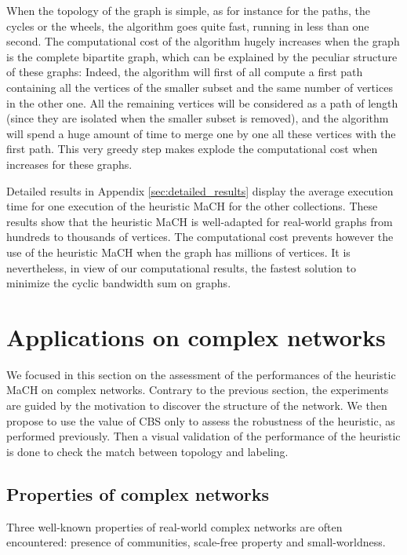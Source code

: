 \documentclass{scrartcl}
\theoremstyle{plain}
\newcommand{\algo}{MaCH}
\newcommand{\cbs}{CBS}
\begin{document}
When the topology of the graph is simple, as for instance for the paths, the 
cycles or the wheels, the algorithm goes quite fast, running in less than one 
second. The computational cost of the algorithm hugely increases when the graph 
is the complete bipartite graph, which can be explained by the peculiar 
structure of these graphs: Indeed, the algorithm will first of all compute a 
first path containing all the vertices of the smaller subset and the same number 
of vertices in the other one. All the remaining vertices will be considered as a 
path of length  (since they are isolated when the smaller subset is removed), 
and the algorithm will spend a huge amount of time to merge one by one all these 
vertices with the first path. This very greedy step makes explode the 
computational cost when  increases for these graphs. 

Detailed results in Appendix \ref{sec:detailed_results} display the average 
execution time for one execution of the heuristic \algo{} for the other 
collections. These results show that the heuristic \algo{} is well-adapted for 
real-world graphs from hundreds to thousands of vertices. The computational cost 
prevents however the use of the heuristic \algo{} when the graph has millions of 
vertices. It is nevertheless, in view of our computational results, the fastest 
solution to minimize the cyclic bandwidth sum on graphs. 
\makeatletter{}\section{Applications on complex networks}
\label{sec:complex}

We focused in this section on the assessment of the performances of the 
heuristic \algo{} on complex networks. Contrary to the previous section, the 
experiments are guided by the motivation to discover the structure of the 
network.  We then propose to use the value of \cbs{} only to assess the 
robustness of the heuristic, as performed previously. Then a visual validation 
of the performance of the heuristic is done to check the match between topology 
and labeling.

\subsection{Properties of complex networks}

Three well-known properties of real-world complex networks are often 
encountered: presence of communities, scale-free property and 
small-worldness.  
\end{document}
